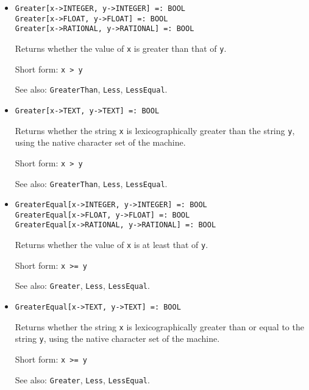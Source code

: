 \begin{itemize}
\item
\protect \large \begin{verbatim}
Greater[x->INTEGER, y->INTEGER] =: BOOL
Greater[x->FLOAT, y->FLOAT] =: BOOL
Greater[x->RATIONAL, y->RATIONAL] =: BOOL
\end{verbatim}\normalsize

\bd
Returns whether the value of \verb+x+ is greater than
that of \verb+y+.
\item
[Short form:] \verb+x > y+
\item
[See also:] {\tt GreaterThan}, {\tt Less}, {\tt LessEqual}.
\ed

\item
\protect \large \begin{verbatim}
Greater[x->TEXT, y->TEXT] =: BOOL
\end{verbatim}\normalsize

\bd
Returns whether the string \verb+x+ is lexicographically greater than
the string \verb+y+, using the native character set of the machine.
\item
[Short form:] \verb+x > y+
\item
[See also:] {\tt GreaterThan}, {\tt Less}, {\tt LessEqual}.
\ed

\item
\protect \large \begin{verbatim}
GreaterEqual[x->INTEGER, y->INTEGER] =: BOOL
GreaterEqual[x->FLOAT, y->FLOAT] =: BOOL
GreaterEqual[x->RATIONAL, y->RATIONAL] =: BOOL
\end{verbatim}\normalsize

\bd
Returns whether the value of \verb+x+ is at least that of
\verb+y+.
\item
[Short form:] \verb+x >= y+
\item
[See also:] {\tt Greater}, {\tt Less}, {\tt LessEqual}.
\ed

\item
\protect \large \begin{verbatim}
GreaterEqual[x->TEXT, y->TEXT] =: BOOL
\end{verbatim}\normalsize

\bd
Returns whether the string \verb+x+ is lexicographically greater than
or equal to the string \verb+y+, using the native character set of the
machine.
\item
[Short form:] \verb+x >= y+
\item
[See also:] {\tt Greater}, {\tt Less}, {\tt LessEqual}.
\ed



\end{itemize}
